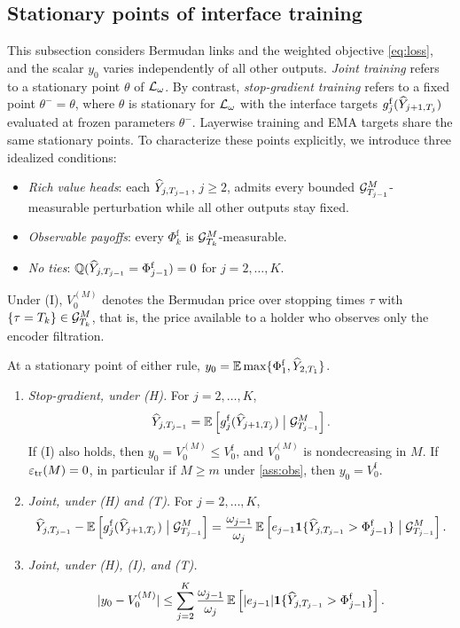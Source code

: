 \subsection{Stationary points of interface training}\label{sec:stationary}

This subsection considers Bermudan links and the weighted objective \eqref{eq:loss}, and the scalar $y_0$ varies independently of all other outputs. \emph{Joint training} refers to a stationary point $\theta$ of $\mathcal{L}_\omega$. By contrast, \emph{stop-gradient training} refers to a fixed point $\theta^-=\theta$, where $\theta$ is stationary for $\mathcal{L}_\omega$ with the interface targets $g^{\mathrm f}_j(\widehat Y_{j+1,T_j})$ evaluated at frozen parameters $\theta^-$. Layerwise training and EMA targets share the same stationary points. To characterize these points explicitly, we introduce three idealized conditions:
\begin{itemize}[leftmargin=2.6em,itemsep=1pt,topsep=2pt]
\item[(H)] \emph{Rich value heads}: each $\widehat Y_{j,T_{j-1}}$, $j\ge2$, admits every bounded $\mathcal{G}^{M}_{T_{j-1}}$-measurable perturbation while all other outputs stay fixed.
\item[(I)] \emph{Observable payoffs}: every $\Phi^{\mathrm f}_k$ is $\mathcal{G}^{M}_{T_k}$-measurable.
\item[(T)] \emph{No ties}: $\mathbb{Q}(\widehat Y_{j,T_{j-1}}=\Phi^{\mathrm f}_{j-1})=0$ for $j=2,\dots,K$.
\end{itemize}
Under (I), $V^{(M)}_0$ denotes the Bermudan price over stopping times $\tau$ with $\{\tau=T_k\}\in\mathcal{G}^{M}_{T_k}$, that is, the price available to a holder who observes only the encoder filtration.

\begin{theorem}\label{thm:stationary}
At a stationary point of either rule, $y_0=\mathbb{E}\max\{\Phi^{\mathrm f}_1,\widehat Y_{2,T_1}\}$.
\begin{enumerate}[label=(\roman*)]
\item \emph{Stop-gradient, under (H).} For $j=2,\dots,K$,
\[
\widehat Y_{j,T_{j-1}}=\mathbb{E}\left[g^{\mathrm f}_j(\widehat Y_{j+1,T_j})\bigm|\mathcal{G}^{M}_{T_{j-1}}\right].
\]
If (I) also holds, then $y_0=V^{(M)}_0\le V^{\mathrm f}_0$, and $V^{(M)}_0$ is nondecreasing in $M$. If $\varepsilon_{\mathrm{tr}}(M)=0$, in particular if $M\ge m$ under \cref{ass:obs}, then $y_0=V^{\mathrm f}_0$.
\item \emph{Joint, under (H) and (T).} For $j=2,\dots,K$,
\[
\widehat Y_{j,T_{j-1}}-\mathbb{E}\left[g^{\mathrm f}_j(\widehat Y_{j+1,T_j})\bigm|\mathcal{G}^{M}_{T_{j-1}}\right]
=\frac{\omega_{j-1}}{\omega_j}\,\mathbb{E}\left[e_{j-1}\mathbf{1}\{\widehat Y_{j,T_{j-1}}>\Phi^{\mathrm f}_{j-1}\}\bigm|\mathcal{G}^{M}_{T_{j-1}}\right].
\]
\item \emph{Joint, under (H), (I), and (T).}
\[
\lvert y_0-V^{(M)}_0\rvert\le\sum_{j=2}^K\frac{\omega_{j-1}}{\omega_j}\,\mathbb{E}\left[\lvert e_{j-1}\rvert\mathbf{1}\{\widehat Y_{j,T_{j-1}}>\Phi^{\mathrm f}_{j-1}\}\right].
\]
\end{enumerate}
\end{theorem}

